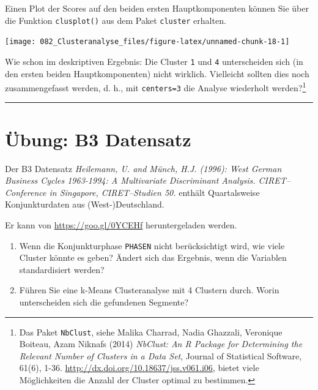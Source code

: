 \documentclass[12pt,]{book}
\makeatletter
\newenvironment{Shaded}{\begin{snugshade}}{\end{snugshade}}
\newcommand{\KeywordTok}[1]{\textcolor[rgb]{0.13,0.29,0.53}{\textbf{{#1}}}}
\newcommand{\DataTypeTok}[1]{\textcolor[rgb]{0.13,0.29,0.53}{{#1}}}
\newcommand{\DecValTok}[1]{\textcolor[rgb]{0.00,0.00,0.81}{{#1}}}
\newcommand{\OtherTok}[1]{\textcolor[rgb]{0.56,0.35,0.01}{{#1}}}
\newcommand{\NormalTok}[1]{{#1}}
\providecommand{\tightlist}{%
  \setlength{\itemsep}{0pt}\setlength{\parskip}{0pt}}
\newenvironment{kframe}{%
\medskip{}
\setlength{\fboxsep}{.8em}
 \def\at@end@of@kframe{}%
 \ifinner\ifhmode%
  \def\at@end@of@kframe{\end{minipage}}%
  \begin{minipage}{\columnwidth}%
 \fi\fi%
 \def\FrameCommand##1{\hskip\@totalleftmargin \hskip-\fboxsep
 \colorbox{shadecolor}{##1}\hskip-\fboxsep
     \hskip-\linewidth \hskip-\@totalleftmargin \hskip\columnwidth}%
 \MakeFramed {\advance\hsize-\width
   \@totalleftmargin\z@ \linewidth\hsize
   \@setminipage}}%
 {\par\unskip\endMakeFramed%
 \at@end@of@kframe}
\renewenvironment{Shaded}{\begin{kframe}}{\end{kframe}}
\makeatother
\begin{document}
Einen Plot der Scores auf den beiden ersten Hauptkomponenten können Sie
über die Funktion \texttt{clusplot()} aus dem Paket \texttt{cluster}
erhalten.

\begin{Shaded}
\end{Shaded}

\begin{center}\texttt{[image: 082\_Clusteranalyse\_files/figure-latex/unnamed-chunk-18-1]} \end{center}

Wie schon im deskriptiven Ergebnis: Die Cluster \texttt{1} und
\texttt{4} unterscheiden sich (in den ersten beiden Hauptkomponenten)
nicht wirklich. Vielleicht sollten dies noch zusammengefasst werden, d.
h., mit \texttt{centers=3} die Analyse wiederholt werden?\footnote{Das
  Paket \texttt{NbClust}, siehe Malika Charrad, Nadia Ghazzali,
  Veronique Boiteau, Azam Niknafs (2014) \emph{NbClust: An R Package for
  Determining the Relevant Number of Clusters in a Data Set}, Journal of
  Statistical Software, 61(6), 1-36.
  \url{http://dx.doi.org/10.18637/jss.v061.i06}, bietet viele
  Möglichkeiten die Anzahl der Cluster optimal zu bestimmen.}

\begin{center}\rule{0.5\linewidth}{\linethickness}\end{center}

\section{Übung: B3 Datensatz}\label{ubung-b3-datensatz}

Der B3 Datensatz \emph{Heilemann, U. and Münch, H.J. (1996): West German
Business Cycles 1963-1994: A Multivariate Discriminant Analysis.
CIRET--Conference in Singapore, CIRET--Studien 50.} enthält
Quartalsweise Konjunkturdaten aus (West-)Deutschland.

Er kann von \url{https://goo.gl/0YCEHf} heruntergeladen werden.

\begin{enumerate}
\def\labelenumi{\arabic{enumi}.}
\tightlist
\item
  Wenn die Konjunkturphase \texttt{PHASEN} nicht berücksichtigt wird,
  wie viele Cluster könnte es geben? Ändert sich das Ergebnis, wenn die
  Variablen standardisiert werden?
\item
  Führen Sie eine k-Means Clusteranalyse mit 4 Clustern durch. Worin
  unterscheiden sich die gefundenen Segmente?
\end{enumerate}
\end{document}

